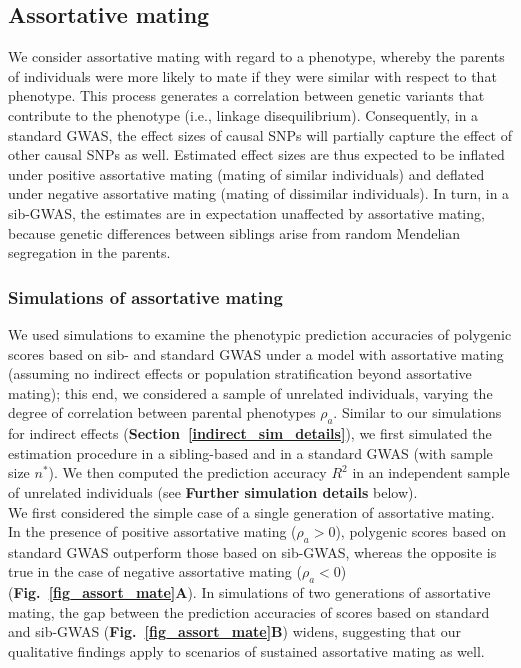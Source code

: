 \documentclass[hidelinks, 12pt]{article}
\begin{document}
\subsection{Assortative mating}
We consider assortative mating with regard to a phenotype, whereby the parents of individuals were more likely to mate if they were similar with respect to that phenotype. This process generates a correlation between genetic variants that contribute to the phenotype (i.e., linkage disequilibrium).  Consequently, in a standard GWAS, the effect sizes of causal SNPs will partially capture the effect of other causal SNPs as well. Estimated effect sizes are thus expected to be inflated under positive assortative mating (mating of similar individuals) and deflated under negative assortative mating (mating of dissimilar individuals). In turn, in a sib-GWAS, the estimates are in expectation unaffected by assortative mating, because genetic differences between siblings arise from random Mendelian segregation in the parents. 

\subsubsection{Simulations of assortative mating}
We used simulations to examine the phenotypic prediction accuracies of polygenic scores based on sib- and standard GWAS under a model with assortative mating (assuming no indirect effects or population stratification beyond assortative mating); this end, we considered a sample of unrelated individuals, varying the degree of correlation between parental phenotypes $\rho_a$. Similar to our simulations for indirect effects ({\bf Section~\ref{indirect_sim_details}}), we first simulated the estimation procedure in a sibling-based and in a standard GWAS (with sample size $n^*$). We then computed the prediction accuracy $R^2$ in an independent sample of unrelated individuals (see {\bf Further simulation details} below).\\

We first considered the simple case of a single generation of assortative mating. In the presence of positive assortative mating ($\rho_a>0$), polygenic scores based on standard GWAS outperform those based on sib-GWAS, whereas the opposite is true in the case of negative assortative mating ($\rho_a<0$) ({\bf Fig.~\ref{fig_assort_mate}A}). In simulations of two generations of assortative mating, the gap between the prediction accuracies of scores based on standard and sib-GWAS ({\bf Fig.~\ref{fig_assort_mate}B}) widens, suggesting that our qualitative findings apply to scenarios of sustained assortative mating as well.\\
\end{document}
